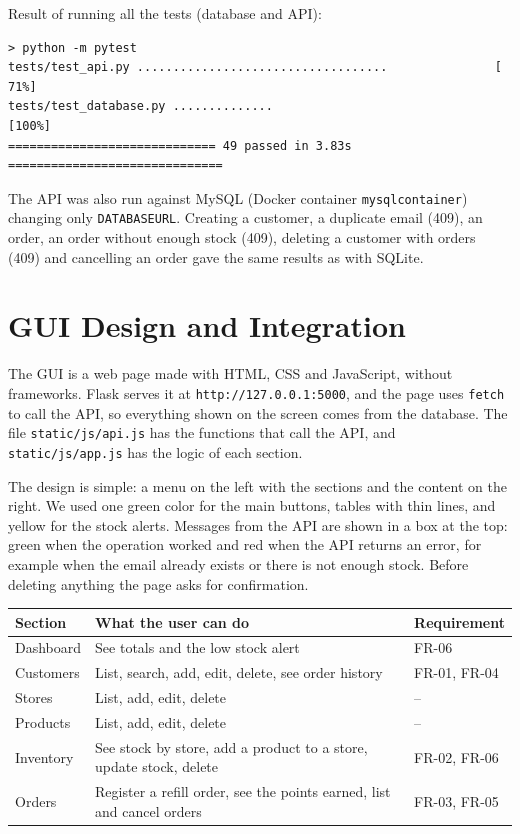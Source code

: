 \documentclass[11pt]{article}
\renewcommand{\_}{\oldus\allowbreak}
\begin{document}
Result of running all the tests (database and API):

\begin{lstlisting}
> python -m pytest
tests/test_api.py ...................................               [ 71%]
tests/test_database.py ..............                                [100%]
============================= 49 passed in 3.83s ==============================
\end{lstlisting}

The API was also run against MySQL (Docker container \texttt{mysqlcontainer}) changing only
\texttt{DATABASE\_URL}. Creating a customer, a duplicate email (409), an order, an order without
enough stock (409), deleting a customer with orders (409) and cancelling an order gave the same
results as with SQLite.

\section{GUI Design and Integration}

The GUI is a web page made with HTML, CSS and JavaScript, without frameworks. Flask serves it at
\texttt{http://127.0.0.1:5000}, and the page uses \texttt{fetch} to call the API, so everything
shown on the screen comes from the database. The file \texttt{static/js/api.js} has the functions
that call the API, and \texttt{static/js/app.js} has the logic of each section.

The design is simple: a menu on the left with the sections and the content on the right. We used
one green color for the main buttons, tables with thin lines, and yellow for the stock alerts.
Messages from the API are shown in a box at the top: green when the operation worked and red when
the API returns an error, for example when the email already exists or there is not enough stock.
Before deleting anything the page asks for confirmation.

\begin{center}
\begin{tabular}{p{2.6cm} p{8cm} p{3.6cm}}
\toprule
\textbf{Section} & \textbf{What the user can do} & \textbf{Requirement} \\
\midrule
Dashboard & See totals and the low stock alert & FR-06 \\
Customers & List, search, add, edit, delete, see order history & FR-01, FR-04 \\
Stores & List, add, edit, delete & -- \\
Products & List, add, edit, delete & -- \\
Inventory & See stock by store, add a product to a store, update stock, delete & FR-02, FR-06 \\
Orders & Register a refill order, see the points earned, list and cancel orders & FR-03, FR-05 \\
\bottomrule
\end{tabular}
\end{center}
\end{document}

